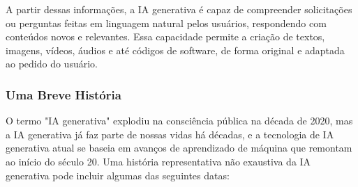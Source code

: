 \documentclass[a4paper, 12pt]{article}
\begin{document}
    A partir dessas informações, a IA generativa é capaz de compreender solicitações ou perguntas feitas em linguagem natural pelos usuários, respondendo com conteúdos novos e relevantes. Essa capacidade permite a criação de textos, imagens, vídeos, áudios e até códigos de software, de forma original e adaptada ao pedido do usuário.

    \subsubsection{Uma Breve História}

    O termo "IA generativa" explodiu na consciência pública na década de 2020, mas a IA generativa já faz parte de nossas vidas há décadas, e a tecnologia de IA generativa atual se baseia em avanços de aprendizado de máquina que remontam ao início do século 20. Uma história representativa não exaustiva da IA generativa pode incluir algumas das seguintes datas:
\end{document}
